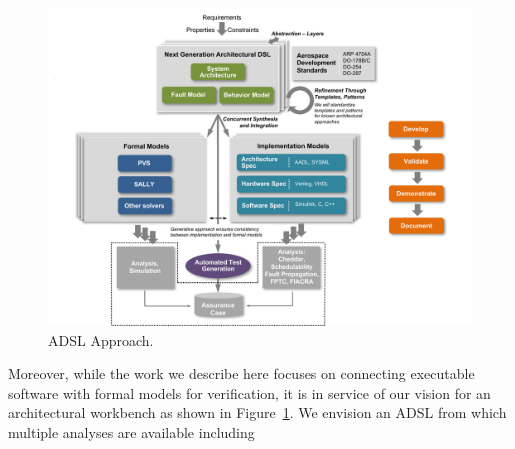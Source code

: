 

\begin{figure}
\begin{center}
\includegraphics[width=1.0\textwidth]{figures/overall_approach}
\caption{ADSL Approach.}
\label{fig:overall_approach}
\end{center}
\end{figure}

Moreover, while the work we describe here focuses on connecting executable software with formal models for verification, it is in service of our vision for an
architectural workbench as shown in Figure~\ref{fig:overall_approach}. We
envision an ADSL from which multiple analyses are available including

